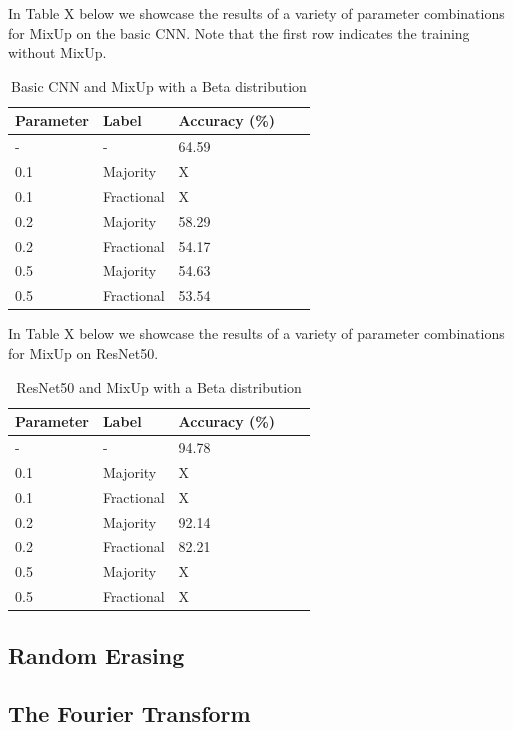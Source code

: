 \documentclass{article}
\begin{document}
In Table X below we showcase the results of a variety of parameter combinations for MixUp on the basic CNN. Note that the first row indicates the training without MixUp.
\begin{table}[H]
	\caption{Basic CNN and MixUp with a Beta distribution}
	\label{sample-table}
	\centering
	\begin{tabular}{lllll}
		\toprule
		Parameter & Label & Accuracy (\%) \\
		\midrule
		 - & - & 64.59  \\
		 0.1 & Majority & X \\
		 0.1 & Fractional & X \\ 
		 0.2 & Majority & 58.29 \\
		 0.2 & Fractional & 54.17 \\ 
		 0.5 & Majority & 54.63 \\
		 0.5 & Fractional & 53.54 \\
		\bottomrule
	\end{tabular}
\end{table}

In Table X below we showcase the results of a variety of parameter combinations for MixUp on ResNet50.

\begin{table}[H]
	\caption{ResNet50 and MixUp with a Beta distribution}
	\label{sample-table}
	\centering
	\begin{tabular}{lllll}
		\toprule
		Parameter & Label & Accuracy (\%) \\
		\midrule
		 - & - & 94.78  \\
		 0.1 & Majority & X \\
		 0.1 & Fractional & X \\ 
		 0.2 & Majority & 92.14 \\
		 0.2 & Fractional & 82.21 \\ 
		 0.5 & Majority & X \\
		 0.5 & Fractional & X \\
		\bottomrule
	\end{tabular}
\end{table}

\subsection{Random Erasing}

\subsection{The Fourier Transform}
\end{document}
